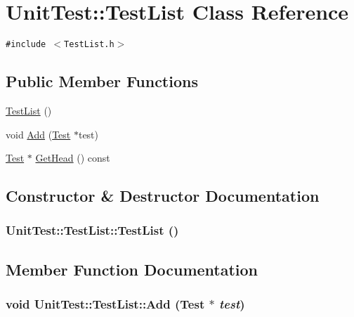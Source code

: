 \hypertarget{class_unit_test_1_1_test_list}{
\section{UnitTest::TestList Class Reference}
\label{class_unit_test_1_1_test_list}
}
{\tt \#include $<$TestList.h$>$}

\subsection*{Public Member Functions}
\begin{CompactItemize}
\item 
\hyperlink{class_unit_test_1_1_test_list_06fa177d76b9b1cc8a1fd5d653a564b4}{TestList} ()
\item 
void \hyperlink{class_unit_test_1_1_test_list_bdfa2c0587c70ff0581ea059b7b39a49}{Add} (\hyperlink{class_unit_test_1_1_test}{Test} $\ast$test)
\item 
\hyperlink{class_unit_test_1_1_test}{Test} $\ast$ \hyperlink{class_unit_test_1_1_test_list_86b24d8d8148bc28a596fc6bcc0b478d}{GetHead} () const 
\end{CompactItemize}


\subsection{Constructor \& Destructor Documentation}
\hypertarget{class_unit_test_1_1_test_list_06fa177d76b9b1cc8a1fd5d653a564b4}{
\subsubsection[{TestList}]{\setlength{\rightskip}{0pt plus 5cm}UnitTest::TestList::TestList ()}}
\label{class_unit_test_1_1_test_list_06fa177d76b9b1cc8a1fd5d653a564b4}




\subsection{Member Function Documentation}
\hypertarget{class_unit_test_1_1_test_list_bdfa2c0587c70ff0581ea059b7b39a49}{
\subsubsection[{Add}]{\setlength{\rightskip}{0pt plus 5cm}void UnitTest::TestList::Add ({\bf Test} $\ast$ {\em test})}}
\label{class_unit_test_1_1_test_list_bdfa2c0587c70ff0581ea059b7b39a49}


